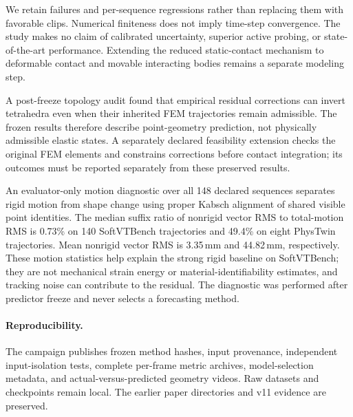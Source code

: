 \documentclass[10pt]{article}
\begin{document}
We retain failures and per-sequence regressions rather than replacing them with favorable clips. Numerical finiteness does not imply time-step convergence. The study makes no claim of calibrated uncertainty, superior active probing, or state-of-the-art performance. Extending the reduced static-contact mechanism to deformable contact and movable interacting bodies remains a separate modeling step.

A post-freeze topology audit found that empirical residual corrections can invert tetrahedra even when their inherited FEM trajectories remain admissible. The frozen results therefore describe point-geometry prediction, not physically admissible elastic states. A separately declared feasibility extension checks the original FEM elements and constrains corrections before contact integration; its outcomes must be reported separately from these preserved results.

An evaluator-only motion diagnostic over all 148 declared sequences separates rigid motion from shape change using proper Kabsch alignment of shared visible point identities. The median suffix ratio of nonrigid vector RMS to total-motion RMS is 0.73\% on 140 SoftVTBench trajectories and 49.4\% on eight PhysTwin trajectories. Mean nonrigid vector RMS is 3.35\,mm and 44.82\,mm, respectively. These motion statistics help explain the strong rigid baseline on SoftVTBench; they are not mechanical strain energy or material-identifiability estimates, and tracking noise can contribute to the residual. The diagnostic was performed after predictor freeze and never selects a forecasting method.

\paragraph{Reproducibility.}
The campaign publishes frozen method hashes, input provenance, independent input-isolation tests, complete per-frame metric archives, model-selection metadata, and actual-versus-predicted geometry videos. Raw datasets and checkpoints remain local. The earlier paper directories and v11 evidence are preserved.
\end{document}
